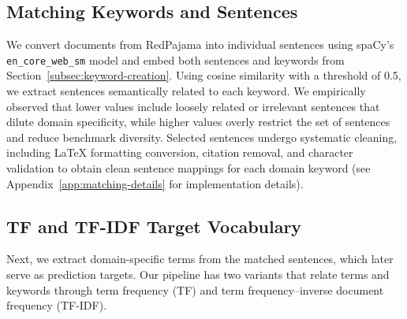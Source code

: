 \documentclass[10pt]{article}
\begin{document}
\subsection{Matching Keywords and Sentences} \vspace*{-.15cm}
\label{subsec:matching-keywords-sentences}
We convert documents from RedPajama into individual sentences using spaCy's \texttt{en\_core\_web\_sm} model \citep{honnibal2020spacy} and embed both sentences and keywords from Section~\ref{subsec:keyword-creation}. Using cosine similarity with a threshold of 0.5, we extract sentences semantically related to each keyword. We empirically observed that lower values include loosely related or irrelevant sentences that dilute domain specificity, while higher values overly restrict the set of sentences and reduce benchmark diversity. Selected sentences undergo systematic cleaning, including LaTeX formatting conversion, citation removal, and character validation to obtain clean sentence mappings for each domain keyword (see Appendix~\ref{app:matching-details} for implementation details).






\subsection{TF and TF-IDF Target Vocabulary} \vspace*{-.15cm}
\label{subsec:tfidf}
Next, we extract domain-specific terms from the matched sentences, which later serve as prediction targets. Our pipeline has two variants that relate terms and keywords through term frequency (TF) and term frequency--inverse document frequency (TF-IDF).
\end{document}
